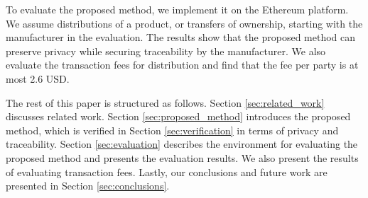 \documentclass[conference]{IEEEtran}
\begin{document}
To evaluate %
the proposed method, %
we implement it on the Ethereum platform.
We assume %
distributions of a product, or transfers of ownership, starting with the manufacturer %
in the evaluation.
The results show that the proposed method can preserve privacy while securing traceability by the manufacturer.
We also evaluate the transaction fees for distribution and find that the fee per %
party is at most 2.6 USD.


The rest of this paper is structured as follows.
Section \ref{sec:related_work} discusses related work.
Section \ref{sec:proposed_method} introduces the proposed method, which is verified in Section \ref{sec:verification} in terms of privacy and traceability.
Section \ref{sec:evaluation} describes the environment for evaluating the proposed method and presents the evaluation results. %
We also present the results of evaluating transaction fees.
Lastly, our conclusions and future work are presented in Section \ref{sec:conclusions}.
\end{document}
